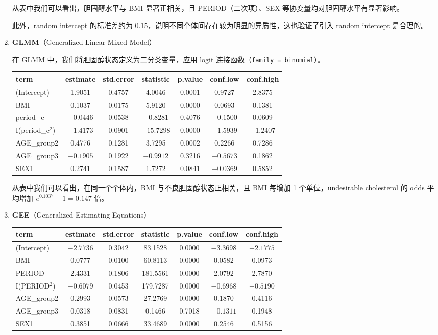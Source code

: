 \begin{enumerate}[label=(\alph*)]
从表中我们可以看出，胆固醇水平与 BMI 显著正相关，且 PERIOD（二次项）、SEX 等协变量均对胆固醇水平有显著影响。

此外，random intercept 的标准差约为 0.15，说明不同个体间存在较为明显的异质性，这也验证了引入 random intercept 是合理的。

\item \textbf{GLMM}（Generalized Linear Mixed Model）

在 GLMM 中，我们将胆固醇状态定义为二分类变量，应用 logit 连接函数（\texttt{family = binomial}）。

\begin{center}
\small
\begin{tabular}{lcccccc}
\toprule
term & estimate & std.error & statistic & p.value & conf.low & conf.high \\
\midrule
(Intercept) & 1.9051 & 0.4757 & 4.0046 & 0.0001 & 0.9727 & 2.8375 \\
BMI & 0.1037 & 0.0175 & 5.9120 & 0.0000 & 0.0693 & 0.1381 \\
period\_c & $-0.0446$ & 0.0538 & $-0.8281$ & 0.4076 & $-0.1500$ & 0.0609 \\
I(period\_c$^2$) & $-1.4173$ & 0.0901 & $-15.7298$ & 0.0000 & $-1.5939$ & $-1.2407$ \\
AGE\_group2 & 0.4776 & 0.1281 & 3.7295 & 0.0002 & 0.2266 & 0.7286 \\
AGE\_group3 & $-0.1905$ & 0.1922 & $-0.9912$ & 0.3216 & $-0.5673$ & 0.1862 \\
SEX1 & 0.2741 & 0.1587 & 1.7272 & 0.0841 & $-0.0369$ & 0.5852 \\
\bottomrule
\end{tabular}
\end{center}

从表中我们可以看出，在同一个个体内，BMI 与不良胆固醇状态正相关，且 BMI 每增加 1 个单位，undesirable cholesterol 的 odds 平均增加 $e^{0.1037}-1=0.147$ 倍。

\item \textbf{GEE}（Generalized Estimating Equations）

\begin{center}
\small
\begin{tabular}{lcccccc}
\toprule
term & estimate & std.error & statistic & p.value & conf.low & conf.high \\
\midrule
(Intercept) & $-2.7736$ & 0.3042 & 83.1528 & 0.0000 & $-3.3698$ & $-2.1775$ \\
BMI & 0.0777 & 0.0100 & 60.8113 & 0.0000 & 0.0582 & 0.0973 \\
PERIOD & 2.4331 & 0.1806 & 181.5561 & 0.0000 & 2.0792 & 2.7870 \\
I(PERIOD$^2$) & $-0.6079$ & 0.0453 & 179.7287 & 0.0000 & $-0.6968$ & $-0.5190$ \\
AGE\_group2 & 0.2993 & 0.0573 & 27.2769 & 0.0000 & 0.1870 & 0.4116 \\
AGE\_group3 & 0.0318 & 0.0831 & 0.1466 & 0.7018 & $-0.1311$ & 0.1948 \\
SEX1 & 0.3851 & 0.0666 & 33.4689 & 0.0000 & 0.2546 & 0.5156 \\
\bottomrule
\end{tabular}
\end{center}


\end{enumerate}

